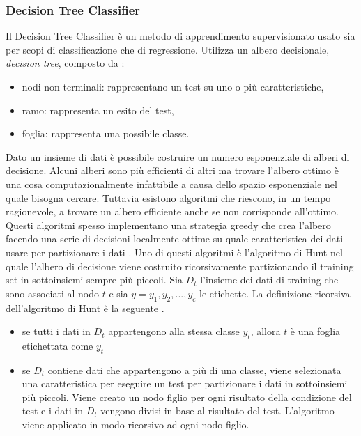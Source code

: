 \documentclass[12pt,italian]{report}
\begin{document}
\subsubsection{Decision Tree Classifier}
Il Decision Tree Classifier è un metodo di apprendimento supervisionato usato sia per scopi di classificazione che di regressione. Utilizza un albero decisionale, \textit{decision tree}, composto da \cite{DataMiningandKnowledgeDiscoveryHandbook}:
\begin{itemize}
	\item nodi non terminali: rappresentano un test su uno o più caratteristiche,
	\item ramo: rappresenta un esito del test,
	\item foglia: rappresenta una possibile classe.
\end{itemize}

Dato un insieme di dati è possibile costruire un numero esponenziale di alberi di decisione. Alcuni alberi sono più efficienti di altri ma trovare l'albero ottimo è una cosa computazionalmente infattibile a causa dello spazio esponenziale nel quale bisogna cercare. Tuttavia esistono algoritmi che riescono, in un tempo ragionevole, a trovare un albero efficiente anche se non corrisponde all'ottimo. Questi algoritmi spesso implementano una strategia greedy che crea l'albero facendo una serie di decisioni localmente ottime su quale caratteristica dei dati usare per partizionare i dati \cite{Introductiontodatamining}.
Uno di questi algoritmi è l'algoritmo di Hunt nel quale l'albero di decisione viene costruito ricorsivamente partizionando il training set in sottoinsiemi sempre più piccoli. Sia $D_t$ l'insieme dei dati di training che sono associati al nodo $t$ e sia $y = {y_1, y_2,...,y_c}$ le etichette. La definizione ricorsiva dell'algoritmo di Hunt è la seguente \cite{Introductiontodatamining}.
\begin{itemize}
	\item se tutti i dati in $D_t$ appartengono alla stessa classe $y_t$, allora $t$ è una foglia etichettata come $y_t$
	\item se $D_t$ contiene dati che appartengono a più di una classe, viene selezionata una caratteristica per eseguire un test per partizionare i dati in sottoinsiemi più piccoli. Viene creato un nodo figlio per ogni risultato della condizione del test e i dati in $D_t$ vengono divisi in base al risultato del test. L'algoritmo viene applicato in modo ricorsivo ad ogni nodo figlio.
\end{itemize}
\end{document}
